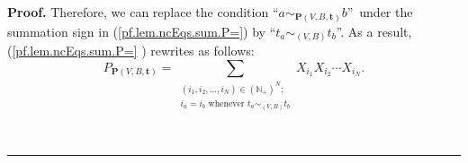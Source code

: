 \documentclass[numbers=enddot,12pt,final,onecolumn,notitlepage]{scrartcl}%
\theoremstyle{definition}
\newenvironment{proof}[1][Proof]{\noindent\textbf{#1.} }{\ \rule{0.5em}{0.5em}}
\newenvironment{vershort}{}{}
\let\sumnonlimits\sum
\renewcommand{\sum}{\sumnonlimits\limits}
\begin{document}
\begin{proof}
\begin{vershort}
Therefore, we can replace the condition \textquotedblleft$a\sim_{\mathbf{P}%
\left(  V,B,\mathbf{t}\right)  }b$\textquotedblright\ under the summation sign
in (\ref{pf.lem.ncEqs.sum.P=}) by \textquotedblleft$t_{a}\sim_{\left(
V,B\right)  }t_{b}$\textquotedblright. As a result, (\ref{pf.lem.ncEqs.sum.P=}%
) rewrites as follows:%
\begin{equation}
P_{\mathbf{P}\left(  V,B,\mathbf{t}\right)  }=\sum_{\substack{\left(
i_{1},i_{2},\ldots,i_{N}\right)  \in\left(  \mathbb{N}_{+}\right)
^{N};\\i_{a}=i_{b}\text{ whenever }t_{a}\sim_{\left(  V,B\right)  }t_{b}%
}}X_{i_{1}}X_{i_{2}}\cdots X_{i_{N}}. \label{pf.lem.ncEqs.sum.short.P=2}%
\end{equation}

\end{vershort}


\end{proof}
\end{document}
